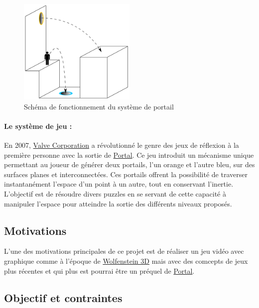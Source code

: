 \documentclass[12pt]{report}
\begin{document}
\begin{figure}
	\centering
	\includegraphics[width=0.5\textwidth]{image/schema_portal.png}
	\hspace*{-0.5cm}
	\caption{Schéma de fonctionnement du système de portail}
	\label{fig:schema_portal}
\end{figure}

\paragraph{Le système de jeu : }
En 2007, \href{https://fr.wikipedia.org/wiki/Valve_Corporation}{Valve Corporation} a révolutionné le genre des jeux 
de réflexion à la première personne avec la sortie de 
\href{https://fr.wikipedia.org/wiki/Portal_(jeu_vid%C3%A9o)}{Portal}. Ce jeu introduit un mécanisme unique 
permettant au joueur de générer deux portails, l'un orange et l'autre bleu, sur des surfaces planes et 
interconnectées. Ces portails offrent la possibilité de traverser instantanément l'espace d'un point à un autre, 
tout en conservant l'inertie. L'objectif est de résoudre divers puzzles en se servant de cette capacité à manipuler 
l'espace pour atteindre la sortie des différents niveaux proposés.



\subsection{Motivations}


L'une des motivations principales de ce projet est de réaliser un jeu vidéo
avec graphique comme à l'époque de \href{https://fr.wikipedia.org/wiki/Wolfenstein_3D}{Wolfenstein 3D} 
mais avec des comcepts de jeux plus récentes et qui plus est pourrai être
un préquel de \href{https://fr.wikipedia.org/wiki/Portal_(jeu_vid%C3%A9o)}{Portal}.


\subsection{Objectif et contraintes}
\end{document}
